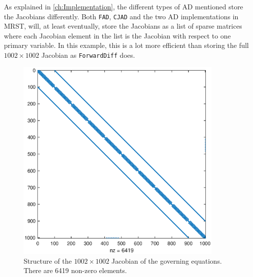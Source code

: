 As explained in \autoref{ch:Implementation}, the different types of AD mentioned store the Jacobians differently. Both \texttt{FAD}, \texttt{CJAD} and the two AD implementations in MRST, will, at least eventually, store the Jacobians as a list of sparse matrices where each Jacobian element in the list is the Jacobian with respect to one primary variable. In this example, this is a lot more efficient than storing the full $1002\times 1002$ Jacobian as  \texttt{ForwardDiff} does.
\begin{figure}[H]
    \centering
    \includegraphics[width = 0.9\textwidth]{figures/flowSolver_Jacobian.eps}
    \caption{Structure of the $1002\times 1002$ Jacobian of the governing equations. There are 6419 non-zero elements.}
    \label{fig:flowSolverJacobian}
\end{figure}
